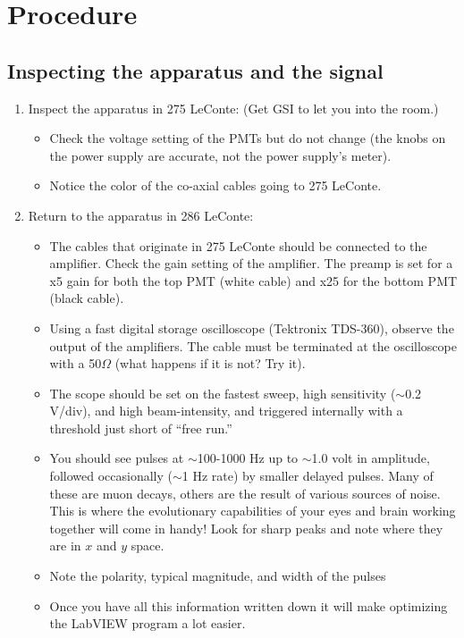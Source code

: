 \documentclass{../lab}
\begin{document}
\section{Procedure}

\subsection{Inspecting the apparatus and the signal}\label{sec:Inspect}

\begin{enumerate}
    \item Inspect the apparatus in 275 LeConte: (Get GSI to let you into the room.)

    \begin{itemize}
        \item Check the voltage setting of the PMTs but do not change (the knobs on the power supply are accurate, not the power supply's meter).

        \item Notice the color of the co-axial cables going to 275 LeConte.

    \end{itemize}

    \item Return to the apparatus in 286 LeConte:

    \begin{itemize}
        \item The cables that originate in 275 LeConte should be connected to the amplifier. Check the gain setting of the amplifier. The preamp is set for a x5 gain for both the top PMT (white cable) and x25 for the bottom PMT (black cable).

        \item Using a fast digital storage oscilloscope (Tektronix TDS-360), observe the output of the amplifiers. The cable must be terminated at the oscilloscope with a 50$\Omega$ (what happens if it is not? Try it).

        \item The scope should be set on the fastest sweep, high sensitivity ($\sim$0.2 V/div), and high beam-intensity, and triggered internally with a threshold just short of ``free run.''

        \item You should see pulses at $\sim$100-1000 Hz up to $\sim$1.0 volt in amplitude, followed occasionally ($\sim$1 Hz rate) by smaller delayed pulses. Many of these are muon decays, others are the result of various sources of noise. This is where the evolutionary capabilities of your eyes and brain working together will come in handy! Look for sharp peaks and note where they are in $x$ and $y$ space.

        \item Note the polarity, typical magnitude, and width of the pulses

        \item Once you have all this information written down it will make optimizing the LabVIEW program a lot easier.

    \end{itemize}

\end{enumerate}
\end{document}
